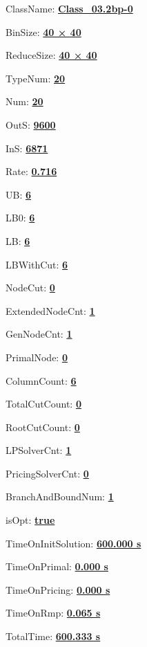 \documentclass[11pt]{article}
\begin{document}
\pagestyle{empty}


ClassName: \underline{\textbf{Class_03.2bp-0}}
\par
BinSize: \underline{\textbf{40 × 40}}
\par
ReduceSize: \underline{\textbf{40 × 40}}
\par
TypeNum: \underline{\textbf{20}}
\par
Num: \underline{\textbf{20}}
\par
OutS: \underline{\textbf{9600}}
\par
InS: \underline{\textbf{6871}}
\par
Rate: \underline{\textbf{0.716}}
\par
UB: \underline{\textbf{6}}
\par
LB0: \underline{\textbf{6}}
\par
LB: \underline{\textbf{6}}
\par
LBWithCut: \underline{\textbf{6}}
\par
NodeCut: \underline{\textbf{0}}
\par
ExtendedNodeCnt: \underline{\textbf{1}}
\par
GenNodeCnt: \underline{\textbf{1}}
\par
PrimalNode: \underline{\textbf{0}}
\par
ColumnCount: \underline{\textbf{6}}
\par
TotalCutCount: \underline{\textbf{0}}
\par
RootCutCount: \underline{\textbf{0}}
\par
LPSolverCnt: \underline{\textbf{1}}
\par
PricingSolverCnt: \underline{\textbf{0}}
\par
BranchAndBoundNum: \underline{\textbf{1}}
\par
isOpt: \underline{\textbf{true}}
\par
TimeOnInitSolution: \underline{\textbf{600.000 s}}
\par
TimeOnPrimal: \underline{\textbf{0.000 s}}
\par
TimeOnPricing: \underline{\textbf{0.000 s}}
\par
TimeOnRmp: \underline{\textbf{0.065 s}}
\par
TotalTime: \underline{\textbf{600.333 s}}
\par
\newpage


\end{document}
